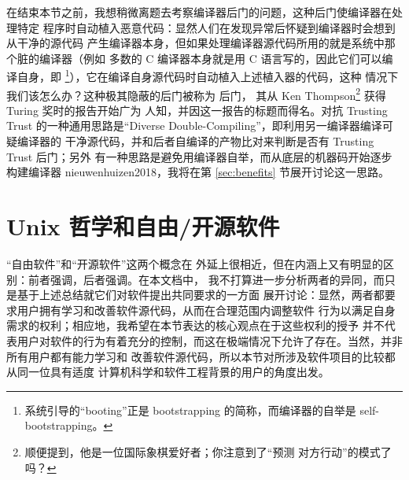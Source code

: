 在结束本节之前，我想稍微离题去考察编译器后门的问题，这种后门使编译器在处理特定
程序时自动植入恶意代码：显然人们在发现异常后怀疑到编译器时会想到从干净的源代码
产生编译器本身，但如果处理编译器源代码所用的就是系统中那个脏的编译器（例如
多数的 C 编译器本身就是用 C 语言写的，因此它们可以编译自身，即%
\footnote{系统引导的“booting”正是 bootstrapping 的简称，而编译器的自举是
self-bootstrapping。}），它在编译自身源代码时自动植入上述植入器的代码，这种
情况下我们该怎么办？这种极其隐蔽的后门被称为  后门，
其从 Ken Thompson\footnote{顺便提到，他是一位国际象棋爱好者；你注意到了“预测
对方行动”的模式了吗？} 获得 Turing 奖时的报告开始广为
人知，并因这一报告的标题而得名。对抗 Trusting Trust 的一种通用思路是“Diverse
Double-Compiling”，即利用另一编译器编译可疑编译器的
干净源代码，并和后者自编译的产物比对来判断是否有 Trusting Trust 后门；另外
有一种思路是避免用编译器自举，而从底层的机器码开始逐步构建编译器\cupercite%
{nieuwenhuizen2018}，我将在第 \ref{sec:benefits} 节展开讨论这一思路。

\section{Unix 哲学和自由/开源软件}\label{sec:foss}

“自由软件”和“开源软件”这两个概念在
外延上很相近，但在内涵上又有明显的区别：前者强调，后者强调。在本文档中，
我不打算进一步分析两者的异同，而只是基于上述总结就它们对软件提出共同要求的一方面
展开讨论：显然，两者都要求用户拥有学习和改善软件源代码，从而在合理范围内调整软件
行为以满足自身需求的权利；相应地，我希望在本节表达的核心观点在于这些权利的授予
并不代表用户对软件的行为有着充分的控制，而这在极端情况下允许了存在。当然，并非所有用户都有能力学习和
改善软件源代码，所以本节对所涉及软件项目的比较都从同一位具有适度
计算机科学和软件工程背景的用户的角度出发。

